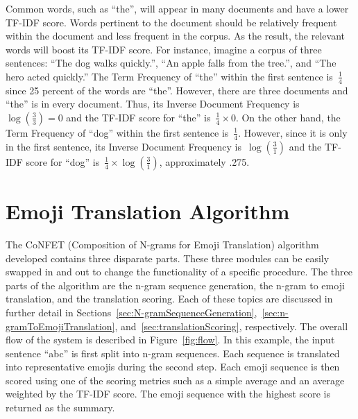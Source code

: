 \documentclass{article}[10]
\begin{document}
Common words, such as ``the'', will appear in many documents and have a lower TF-IDF score. Words pertinent to the document should be relatively frequent within the document and less frequent in the corpus. As the result, the relevant words will boost its TF-IDF score. For instance, imagine a corpus of three sentences: ``The dog walks quickly.'', ``An apple falls from the tree.'', and ``The hero acted quickly.'' The Term Frequency of ``the'' within the first sentence is~\(\frac{1}{4}\) since 25 percent of the words are ``the''. However, there are three documents and ``the'' is in every document. Thus, its Inverse Document Frequency is~\( \log(\frac{3}{3}) = 0 \) and the TF-IDF score for ``the'' is~\(\frac{1}{4} \times 0\). On the other hand, the Term Frequency of ``dog'' within the first sentence is~\(\frac{1}{4}\). However, since it is only in the first sentence, its Inverse Document Frequency is~\(\log(\frac{3}{1})\) and the TF-IDF score for ``dog'' is~\(\frac{1}{4} \times \log(\frac{3}{1})\), approximately .275.

\section{Emoji Translation Algorithm\label{sec:EmojiTranslationAlgorithm}}

The CoNFET (Composition of N-grams for Emoji Translation) algorithm developed contains three disparate parts. These three modules can be easily swapped in and out to change the functionality of a specific procedure. The three parts of the algorithm are the n-gram sequence generation, the n-gram to emoji translation, and the translation scoring. Each of these topics are discussed in further detail in Sections~\ref{sec:N-gramSequenceGeneration},~\ref{sec:n-gramToEmojiTranslation}, and~\ref{sec:translationScoring}, respectively. The overall flow of the system is described in Figure~\ref{fig:flow}. In this example, the input sentence ``abc'' is first split into n-gram sequences. Each sequence is translated into representative emojis during the second step. Each emoji sequence is then scored using one of the scoring metrics such as a simple average and an average weighted by the TF-IDF score. The emoji sequence with the highest score is returned as the summary.
\end{document}
